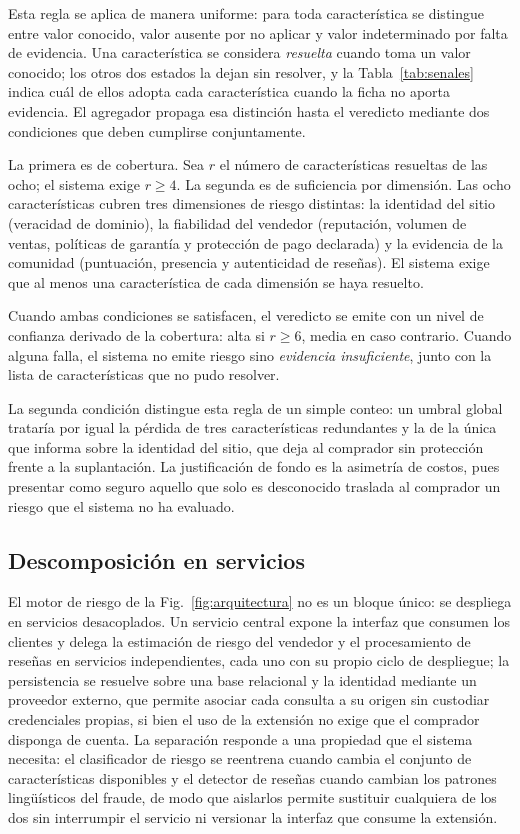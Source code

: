 Esta regla se aplica de manera uniforme: para toda característica se distingue entre valor
conocido, valor ausente por no aplicar y valor indeterminado por falta de evidencia. Una
característica se considera \emph{resuelta} cuando toma un valor conocido; los otros dos
estados la dejan sin resolver, y la Tabla~\ref{tab:senales} indica cuál de ellos adopta cada
característica cuando la ficha no aporta evidencia. El agregador propaga esa distinción hasta
el veredicto mediante dos condiciones que deben cumplirse conjuntamente.

La primera es de cobertura. Sea $r$ el número de características resueltas de las ocho; el
sistema exige $r \geq 4$. La segunda es de suficiencia por dimensión. Las ocho características
cubren tres dimensiones de riesgo distintas: la identidad del sitio (veracidad de dominio), la
fiabilidad del vendedor (reputación, volumen de ventas, políticas de garantía y protección de
pago declarada) y la evidencia de la comunidad (puntuación, presencia y autenticidad de
reseñas). El sistema exige que al menos una característica de cada dimensión se haya resuelto.

Cuando ambas condiciones se satisfacen, el veredicto se emite con un nivel de confianza
derivado de la cobertura: alta si $r \geq 6$, media en caso contrario. Cuando alguna falla, el
sistema no emite riesgo sino \emph{evidencia insuficiente}, junto con la lista de
características que no pudo resolver.

La segunda condición distingue esta regla de un simple conteo: un umbral global trataría por
igual la pérdida de tres características redundantes y la de la única que informa sobre la
identidad del sitio, que deja al comprador sin protección frente a la suplantación. La
justificación de fondo es la asimetría de costos, pues presentar como seguro aquello que solo
es desconocido traslada al comprador un riesgo que el sistema no ha evaluado.

\subsection{Descomposición en servicios}

El motor de riesgo de la Fig.~\ref{fig:arquitectura} no es un bloque único: se despliega en
servicios desacoplados. Un servicio central expone la interfaz que consumen los clientes y
delega la estimación de riesgo del vendedor y el procesamiento de reseñas en servicios
independientes, cada uno con su propio ciclo de despliegue; la persistencia se resuelve sobre
una base relacional y la identidad mediante un proveedor externo, que permite asociar cada
consulta a su origen sin custodiar credenciales propias, si bien el uso de la extensión no
exige que el comprador disponga de cuenta. La separación responde a una propiedad que el
sistema necesita: el clasificador de riesgo se reentrena cuando cambia el conjunto de
características disponibles y el detector de reseñas cuando cambian los patrones lingüísticos
del fraude, de modo que aislarlos permite sustituir cualquiera de los dos sin interrumpir el
servicio ni versionar la interfaz que consume la extensión.

